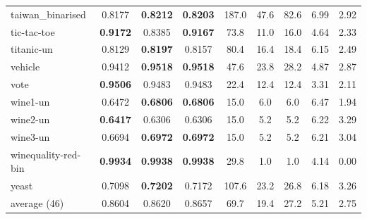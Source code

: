 \begin{table}[htbp]
\begin{tabular}{l|ccc|ccc|cc}
taiwan\_binarised & 0.8177 & \textbf{0.8212} & \textbf{0.8203} & 187.0 & 47.6 & 82.6 & 6.99 & 2.92 \\
tic-tac-toe & \textbf{0.9172} & 0.8385 & \textbf{0.9167} & 73.8 & 11.0 & 16.0 & 4.64 & 2.33 \\
titanic-un & 0.8129 & \textbf{0.8197} & 0.8157 & 80.4 & 16.4 & 18.4 & 6.15 & 2.49 \\
vehicle & 0.9412 & \textbf{0.9518} & \textbf{0.9518} & 47.6 & 23.8 & 28.2 & 4.87 & 2.87 \\
vote & \textbf{0.9506} & 0.9483 & 0.9483 & 22.4 & 12.4 & 12.4 & 3.31 & 2.11 \\
wine1-un & 0.6472 & \textbf{0.6806} & \textbf{0.6806} & 15.0 & 6.0 & 6.0 & 6.47 & 1.94 \\
wine2-un & \textbf{0.6417} & 0.6306 & 0.6306 & 15.0 & 5.2 & 5.2 & 6.22 & 3.29 \\
wine3-un & 0.6694 & \textbf{0.6972} & \textbf{0.6972} & 15.0 & 5.2 & 5.2 & 6.21 & 3.04 \\
winequality-red-bin & \textbf{0.9934} & \textbf{0.9938} & \textbf{0.9938} & 29.8 & 1.0 & 1.0 & 4.14 & 0.00 \\
yeast & 0.7098 & \textbf{0.7202} & 0.7172 & 107.6 & 23.2 & 26.8 & 6.18 & 3.26 \\
\midrule
average (46) & 0.8604 & 0.8620 & 0.8657 & 69.7 & 19.4 & 27.2 & 5.21 & 2.75 \\
\bottomrule
\end{tabular}
\end{table}